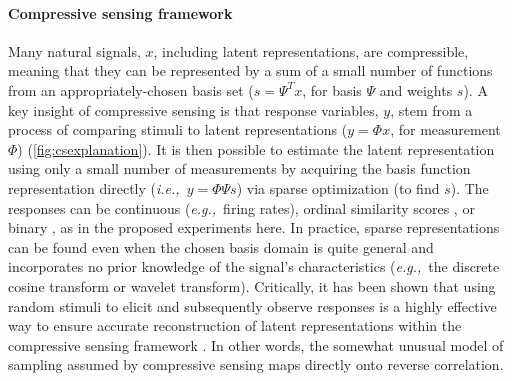 \documentclass[11pt, notitlepage]{article} %
\def\eg{{\emph{e.g.,}}~}
\def\ie{{\emph{i.e.,}}~}
\begin{document}
\paragraph{Compressive sensing framework}

Many natural signals, $x$, including latent representations, are compressible,
meaning that they can be represented by a sum of a small number of functions
from an appropriately-chosen basis set ($s = \Psi^{T}x$, for basis $\Psi$ and weights $s$).
A key insight of compressive sensing is that response variables, $y$,
stem from a process of comparing stimuli to latent representations
($y = \Phi x$, for measurement $\Phi$) (\autoref{fig:csexplanation}).
It is then possible to estimate the latent representation
using only a small number of measurements
by acquiring the basis function representation directly (\ie $ y = \Phi \Psi s$)
via sparse optimization (to find $s$).
The responses can be continuous (\eg firing rates),
ordinal similarity scores
\cite{zymnisCompressedSensingQuantized2010},
or binary \cite{boufounos1BitCompressiveSensing2008,planOneBitCompressedSensing2013},
as in the proposed experiments here.
In practice, sparse representations can be found even when the chosen basis domain is quite general
and incorporates no prior knowledge of the signal's characteristics
(\eg the discrete cosine transform or wavelet transform).
Critically, it has been shown that using random stimuli to elicit
and subsequently observe responses
is a highly effective way to ensure accurate reconstruction of latent representations
within the compressive sensing framework
\cite{candesIntroductionCompressiveSampling2008,candesRestrictedIsometryProperty2008,wojtaszczykStabilityInstanceOptimality2010}.
In other words, the somewhat
unusual model of sampling assumed by compressive sensing maps directly onto reverse correlation.
\end{document}
